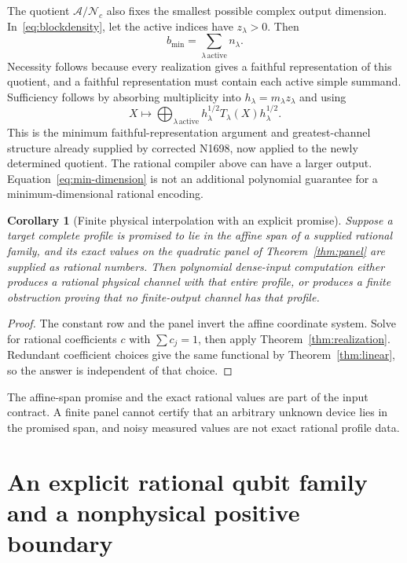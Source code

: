 \documentclass[11pt,a4paper]{article}
\newtheorem{corollary}[theorem]{Corollary}
\theoremstyle{definition}\newtheorem{definition}[theorem]{Definition}
\newcommand{\Alg}{\mathcal A}
\newcommand{\Nul}{\mathcal N}
\begin{document}
The quotient $\Alg/\Nul_c$ also fixes the smallest possible complex output dimension. In~\eqref{eq:blockdensity}, let the active indices have $z_\lambda>0$. Then
\begin{equation}\label{eq:min-dimension}
 b_{\min}=\sum_{\lambda\,\mathrm{active}}n_\lambda.
\end{equation}
Necessity follows because every realization gives a faithful representation of this quotient, and a faithful representation must contain each active simple summand. Sufficiency follows by absorbing multiplicity into $h_\lambda=m_\lambda z_\lambda$ and using
\[
 X\longmapsto\bigoplus_{\lambda\,\mathrm{active}}
 h_\lambda^{1/2}T_\lambda(X)h_\lambda^{1/2}.
\]
This is the minimum faithful-representation argument and greatest-channel structure already supplied by corrected N1698, now applied to the newly determined quotient. The rational compiler above can have a larger output. Equation~\eqref{eq:min-dimension} is not an additional polynomial guarantee for a minimum-dimensional rational encoding.

\begin{corollary}[Finite physical interpolation with an explicit promise]\label{cor:interpolation}
Suppose a target complete profile is promised to lie in the affine span of a supplied rational family, and its exact values on the quadratic panel of Theorem~\ref{thm:panel} are supplied as rational numbers. Then polynomial dense-input computation either produces a rational physical channel with that entire profile, or produces a finite obstruction proving that no finite-output channel has that profile.
\end{corollary}
\begin{proof}
The constant row and the panel invert the affine coordinate system. Solve for rational coefficients $c$ with $\sum c_j=1$, then apply Theorem~\ref{thm:realization}. Redundant coefficient choices give the same functional by Theorem~\ref{thm:linear}, so the answer is independent of that choice.
\end{proof}
The affine-span promise and the exact rational values are part of the input contract. A finite panel cannot certify that an arbitrary unknown device lies in the promised span, and noisy measured values are not exact rational profile data.

\section{An explicit rational qubit family and a nonphysical positive boundary}\label{sec:example}
\end{document}
